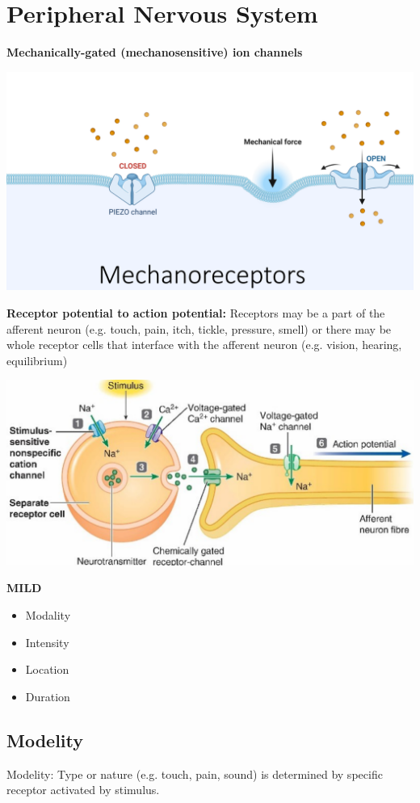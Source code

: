 \documentclass[11pt,fleqn]{book}
\begin{document}
\section{Peripheral Nervous System}
\textbf{Mechanically-gated (mechanosensitive) ion channels}
\begin{center}
    \includegraphics[width=0.65\linewidth]{Pictures/Screenshot 2024-03-06 192802.png}
\end{center}
\textbf{Receptor potential to action potential:} Receptors may be a part of the afferent neuron (e.g. touch, pain, itch, tickle, pressure, smell) or there may be whole receptor cells that interface with the afferent neuron (e.g. vision, hearing, equilibrium)
\begin{center}
    \includegraphics[width=0.65\linewidth]{Pictures/Screenshot 2024-03-06 193004.png}
\end{center}
\textbf{MILD}
\begin{itemize}
    \item Modality
    \item Intensity
    \item Location
    \item Duration
\end{itemize}

\subsection{Modelity}
Modelity: Type or nature (e.g. touch, pain, sound) is determined by specific receptor activated by stimulus.
\end{document}
